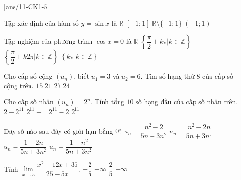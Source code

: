 \begin{name}
	{\tenchude}
	{\tendethi}
	{\tentruong}
	{\thoigian}
\end{name}
\TN
{}[ans/11-CK1-5]
\begin{ex}%
	Tập xác định của hàm số  $y=\sin x$ là
	\choice
	{\True $\mathbb{R}$}
	{$[-1;1]$}
	{$\mathbb{R}\setminus \{-1;1\}$}
	{$(-1;1)$}
\end{ex}

\begin{ex}%
	Tập nghiệm của phương trình $\cos x=0$ là
	\choice
	{$\mathbb{R}$}
	{\True $\left\{ \dfrac{\pi}{2}+k\pi |k \in \mathbb{Z}\right\}$}
	{$\left\{ \dfrac{\pi}{2}+k2\pi |k \in \mathbb{Z}\right\}$}
	{$\left\{k\pi |k \in \mathbb{Z}\right\}$}
\end{ex}

\begin{ex}%
	Cho cấp số cộng \( \left(u_n\right) \), biết \( u_1 = 3 \) và \( u_2 = 6 \). Tìm số hạng thứ $8$ của cấp số cộng trên.
	\choice
	{$15$}
	{$21$}
	{$27$}
	{\True $24$}
\end{ex}

\begin{ex}%
	Cho cấp số nhân \( \left(u_n\right)=2^n \). Tính tổng $10$ số hạng đầu của cấp số nhân trên.
	\choice
	{$2-2^{11}$}
	{$2^{11}-1$}
	{\True $2^{11}-2$}
	{$2^{11}$}
\end{ex}

\begin{ex}%
	Dãy số nào sau đây có giới hạn bằng \( 0 \)?
	\choice
	{$u_n=\dfrac{n^2-2}{5n+3n^2}$}
	{$u_n=\dfrac{n^2-2n}{5n+3n^2}$}
	{\True $u_n=\dfrac{1-2n}{5n+3n^2}$}
	{$u_n=\dfrac{1-n^2}{5n+3n^2}$}
\end{ex}

\begin{ex}%
	Tính \( \lim\limits_{x \to 5} \dfrac{x^2-12x+35}{25-5x} \).
	\choice
	{$-\dfrac{2}{5}$}
	{$+\infty$}
	{\True $\dfrac{2}{5}$}
	{$-\infty$}
\end{ex}

